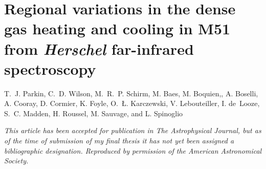 \pagestyle{fancy}
\headheight 20pt
\chead{}
\lfoot{}
\cfoot{\thepage}
\rfoot{}
\renewcommand{\headrulewidth}{0.1pt}
\renewcommand{\footrulewidth}{0.1pt}


\chapter{Regional variations in the dense gas heating and cooling in M51 from \emph{Herschel} far-infrared spectroscopy} \label{chapter3}

\thispagestyle{fancy}

\noindent T.~J. Parkin, C.~D. Wilson, M.~R.~P. Schirm, M. Baes, M. Boquien,, A. Boselli, A. Cooray, D. Cormier, K. Foyle, O.~\L. Karczewski, V. Lebouteiller, I. de~Looze, S.~C. Madden, H. Roussel, M. Sauvage, and L. Spinoglio

\vspace{1.5cm}

\noindent \emph{This article has been accepted for publication in The Astrophysical Journal, but as of the time of submission of my final thesis it has not yet been assigned a bibliographic designation.  Reproduced by permission of the American Astronomical Society.}




